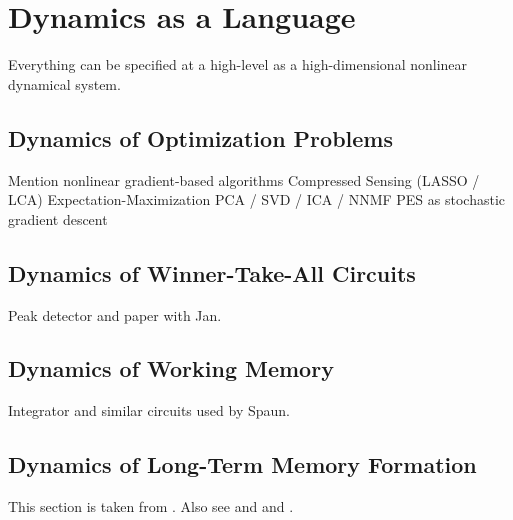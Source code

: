 \section{Dynamics as a Language}

Everything can be specified at a high-level as a high-dimensional nonlinear dynamical system.

\subsection{Dynamics of Optimization Problems}

Mention nonlinear gradient-based algorithms 
 Compressed Sensing (LASSO / LCA)
 Expectation-Maximization
 PCA / SVD / ICA / NNMF
 PES as stochastic gradient descent

\subsection{Dynamics of Winner-Take-All Circuits}

Peak detector and paper with Jan.

\subsection{Dynamics of Working Memory}

Integrator and similar circuits used by Spaun.

\subsection{Dynamics of Long-Term Memory Formation}

This section is taken from \citet{voelker2014a}. Also see \citet{trujillo2014a} and \citet{aubin2016a} and \citet{knight2016}.

